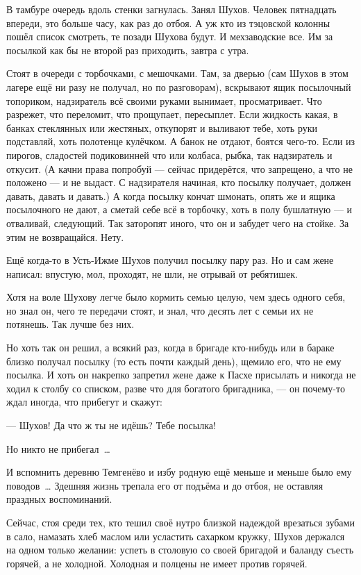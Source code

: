 В тамбуре очередь вдоль стенки загнулась. Занял Шухов. Человек пятнадцать впереди, это больше часу, как раз до отбоя. А уж кто из тэцовской колонны пошёл список смотреть, те позади Шухова будут. И мехзаводские все. Им за посылкой как бы не второй раз приходить, завтра с утра.

Стоят в очереди с торбочками, с мешочками. Там, за дверью (сам Шухов в этом лагере ещё ни разу не получал, но по разговорам), вскрывают ящик посылочный топориком, надзиратель всё своими руками вынимает, просматривает. Что разрежет, что переломит, что прощупает, пересыплет. Если жидкость какая, в банках стеклянных или жестяных, откупорят и выливают тебе, хоть руки подставляй, хоть полотенце кулёчком. А банок не отдают, боятся чего-то. Если из пирогов, сладостей подиковинней что или колбаса, рыбка, так надзиратель и откусит. (А качни права попробуй --- сейчас придерётся, что запрещено, а что не положено --- и не выдаст. С надзирателя начиная, кто посылку получает, должен давать, давать и давать.) А когда посылку кончат шмонать, опять же и ящика посылочного не дают, а сметай себе всё в торбочку, хоть в полу бушлатную --- и отваливай, следующий. Так заторопят иного, что он и забудет чего на стойке. За этим не возвращайся. Нету.

Ещё когда-то в Усть-Ижме Шухов получил посылку пару раз. Но и сам жене написал: впустую, мол, проходят, не шли, не отрывай от ребятишек.

Хотя на воле Шухову легче было кормить семью целую, чем здесь одного себя, но знал он, чего те передачи стоят, и знал, что десять лет с семьи их не потянешь. Так лучше без них.

Но хоть так он решил, а всякий раз, когда в бригаде кто-нибудь или в бараке близко получал посылку (то есть почти каждый день), щемило его, что не ему посылка. И хоть он накрепко запретил жене даже к Пасхе присылать и никогда не ходил к столбу со списком, разве что для богатого бригадника, --- он почему-то ждал иногда, что прибегут и скажут:

--- Шухов! Да что ж ты не идёшь? Тебе посылка!

Но никто не прибегал~\dots{}

И вспомнить деревню Темгенёво и избу родную ещё меньше и меньше было ему поводов~\dots{} Здешняя жизнь трепала его от подъёма и до отбоя, не оставляя праздных воспоминаний.

Сейчас, стоя среди тех, кто тешил своё нутро близкой надеждой врезаться зубами в сало, намазать хлеб маслом или усластить сахарком кружку, Шухов держался на одном только желании: успеть в столовую со своей бригадой и баланду съесть горячей, а не холодной. Холодная и полцены не имеет против горячей.

